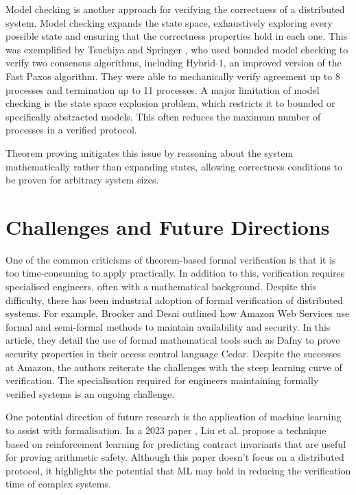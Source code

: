 \documentclass[acmsmall,screen,review]{acmart}
\begin{document}
  Model checking is another approach for verifying the correctness of a distributed system.
  Model checking expands the state space, exhaustively exploring every possible state and ensuring that the correctness properties hold in each one.
  This was exemplified by Tsuchiya and Springer \cite{tsuchiyaUsingBoundedModel2008},
  who used bounded model checking to verify two consensus algorithms, including Hybrid-1, an improved version of the Fast Paxos algorithm.
  They were able to mechanically verify agreement up to 8 processes and termination up to 11 processes. 
  A major limitation of model checking is the state space explosion problem, which restricts it to bounded or specifically abstracted models. 
  This often reduces the maximum number of processes in a verified protocol. 

  Theorem proving mitigates this issue by reasoning about the system mathematically rather than expanding states, allowing correctness conditions to be proven for arbitrary system sizes.

\section{Challenges and Future Directions}
  One of the common criticisms of theorem-based formal verification is that it is too time-consuming to apply practically.
  In addition to this, verification requires specialised engineers, often with a mathematical background.
  Despite this difficulty, there has been industrial adoption of formal verification of distributed systems.
  For example, Brooker and Desai \cite{brookerSystemsCorrectnessPractices2025} outlined how Amazon Web Services use formal
  and semi-formal methods to maintain availability and security.
  In this article, they detail the use of formal mathematical tools such as Dafny to prove security properties in their access control language Cedar.
  Despite the successes at Amazon, the authors reiterate the challenges with the steep learning curve of verification. 
  The specialisation required for engineers maintaining formally verified systems is an ongoing challenge.

  One potential direction of future research is the application of machine learning to assist with formalisation.
  In a 2023 paper \cite{liuLearningContractInvariants2023},
  Liu et al. propose a technique based on reinforcement learning for predicting contract invariants that are useful for proving arithmetic safety.
  Although this paper doesn't focus on a distributed protocol, it highlights the potential that ML may hold in reducing the verification time of complex systems.
\end{document}
